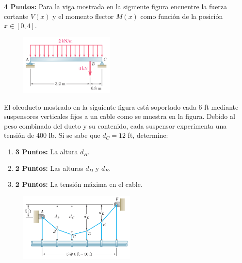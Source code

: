 \documentclass[ a4paper, twoside, 11pt]{article}
\begin{document}
\begin{problem}
\textbf{4 Puntos:} Para la viga mostrada en la siguiente figura encuentre la fuerza cortante $V(x)$ y el momento flector $M(x)$ como funci\'on de la posici\'on $x \in [0,4]$. 

\begin{figure}[htb]
\centering
\includegraphics[width=0.42\textwidth]{prob-vigas.jpg}
\end{figure}

\end{problem}
\fullskip

\begin{problem}
El oleoducto mostrado en la siguiente figura est\'a soportado cada 6 ft mediante suspensores verticales fijos a un cable como se muestra en la figura. Debido al peso combinado del ducto y su contenido, cada suspensor experimenta una tensi\'on de 400 lb. Si se sabe que $d_C = 12$ ft, determine: 
\begin{enumerate}[label=\textbf{\alph*)}]
\item \textbf{3 Puntos:} La altura $d_B$. 
\item \textbf{2 Puntos:} Las alturas $d_D$ y $d_E$. 
\item \textbf{2 Puntos:} La tensi\'on m\'axima en el cable. 
\end{enumerate}

\begin{figure}[htb]
\centering
\includegraphics[width=0.52\textwidth]{prob-cables.jpg}
\end{figure}

\end{problem}
\fullskip
\end{document}
